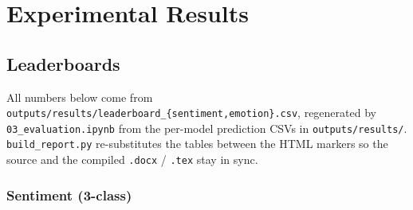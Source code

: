 \documentclass[
  english,
  11pt,
]{article}
\begin{document}
\section{Experimental Results}\label{experimental-results}

\subsection{Leaderboards}\label{leaderboards}

All numbers below come from
\texttt{outputs/results/leaderboard\_\{sentiment,emotion\}.csv},
regenerated by \texttt{03\_evaluation.ipynb} from the per-model
prediction CSVs in \texttt{outputs/results/}. \texttt{build\_report.py}
re-substitutes the tables between the HTML markers so the source and the
compiled \texttt{.docx} / \texttt{.tex} stay in sync.

\subsubsection{Sentiment (3-class)}\label{sentiment-3-class}
\end{document}
